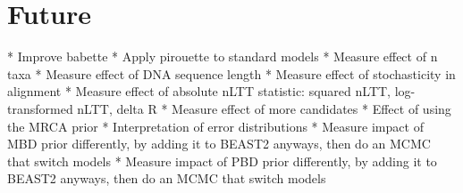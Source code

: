 \section{Future}

 * Improve babette
 * Apply pirouette to standard models
   * Measure effect of n taxa
   * Measure effect of DNA sequence length
   * Measure effect of stochasticity in alignment
   * Measure effect of absolute nLTT statistic: squared nLTT, 
     log-transformed nLTT, delta R 
   * Measure effect of more candidates
   * Effect of using the MRCA prior
   * Interpretation of error distributions 
 * Measure impact of MBD prior differently, by adding it to BEAST2
   anyways, then do an MCMC that switch models
 * Measure impact of PBD prior differently, by adding it to BEAST2
   anyways, then do an MCMC that switch models




